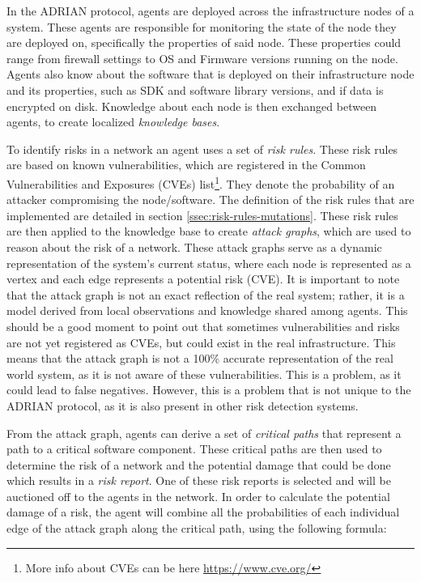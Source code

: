 In the ADRIAN protocol, agents are deployed across the infrastructure nodes of a system. These agents are responsible for monitoring the state of the node they are deployed on, specifically the properties of said node. These properties could range from firewall settings to OS and Firmware versions running on the node. Agents also know about the software that is deployed on their infrastructure node and its properties, such as SDK and software library versions, and if data is encrypted on disk. Knowledge about each node is then exchanged between agents, to create localized \emph{knowledge bases}.

\vspace{0.5em}
To identify risks in a network an agent uses a set of \emph{risk rules}. These risk rules are based on known vulnerabilities, which are registered in the Common Vulnerabilities and Exposures (CVEs) list\footnote{More info about CVEs can be here \url{https://www.cve.org/} }. They denote the probability of an attacker compromising the node/software. The definition of the risk rules that are implemented are detailed in section \ref{ssec:risk-rules-mutations}.
These risk rules are then applied to the knowledge base to create \emph{attack graphs}, which are used to reason about the risk of a network. These attack graphs serve as a dynamic representation of the system's current status, where each node is represented as a vertex and each edge represents a potential risk (CVE). It is important to note that the attack graph is not an exact reflection of the real system; rather, it is a model derived from local observations and knowledge shared among agents. 
This should be a good moment to point out that sometimes vulnerabilities and risks are not yet registered as CVEs, but could exist in the real infrastructure. This means that the attack graph is not a 100\% accurate representation of the real world system, as it is not aware of these vulnerabilities. This is a problem, as it could lead to false negatives. However, this is a problem that is not unique to the ADRIAN protocol, as it is also present in other risk detection systems.

From the attack graph, agents can derive a set of \emph{critical paths} that represent a path to a critical software component. These critical paths are then used to determine the risk of a network and the potential damage that could be done which results in a \emph{risk report}. One of these risk reports is selected and will be auctioned off to the agents in the network. In order to calculate the potential damage of a risk, the agent will combine all the probabilities of each individual edge of the attack graph along the critical path, using the following formula:

